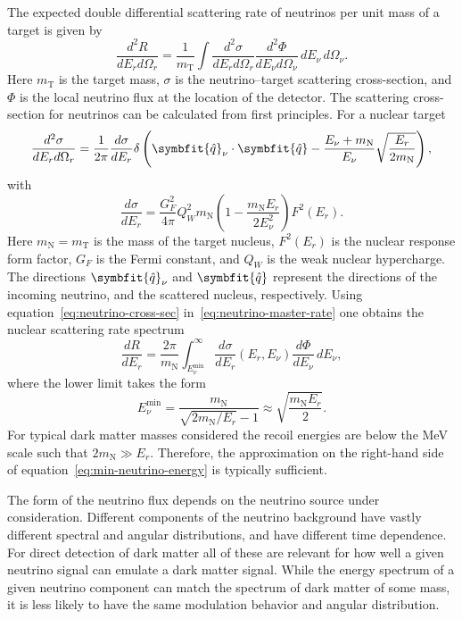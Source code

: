 \documentclass[b5paper, 10pt, twoside]{book}
\newcommand{\der}[2]{\frac{d#1}{d#2}}
\newcommand{\ddder}[3]{\frac{d^2#1}{d#2d#3}}
\newcommand{\unitv}[1]{\symbfit{\hat{#1}}}
\newcommand{\difd}{\,d}
\begin{document}
The expected double differential scattering rate of neutrinos per unit mass of a target is given by
\begin{equation}
\ddder{R}{E_r}{\Omega_r}=\frac{1}{m_\text{T}}\int\ddder{\sigma}{E_r}{\Omega_r}\ddder{\Phi}{E_\nu}{\Omega_\nu}\difd E_\nu\difd\Omega_\nu.
\label{eq:neutrino-master-rate}
\end{equation}
Here $m_\text{T}$ is the target mass, $\sigma$ is the neutrino--target scattering cross-section, and $\Phi$ is the local neutrino flux at the location of the detector. The scattering cross-section for neutrinos can be calculated from first principles. For a nuclear target
\begin{equation}
\ddder{\sigma}{E_r}{\Omega_r}=\frac{1}{2\pi}\der{\sigma}{E_r}\delta\left(\unitv{q}_\nu\cdot\unitv{q}-\frac{E_\nu+m_\text{N}}{E_\nu}\sqrt{\frac{E_r}{2m_\text{N}}}\right),
\label{eq:neutrino-cross-sec}
\end{equation}
with
\begin{equation}
\der{\sigma}{E_r}=\frac{G_F^2}{4\pi}Q_W^2m_\text{N}\left(1-\frac{m_\text{N}E_r}{2E_\nu^2}\right)F^2(E_r).
\end{equation}
Here $m_\text{N}=m_\text{T}$ is the mass of the target nucleus, $F^2(E_r)$ is the nuclear response form factor, $G_F$ is the Fermi constant, and $Q_W$ is the weak nuclear hypercharge. The directions $\unitv{q}_\nu$ and $\unitv{q}$ represent the directions of the incoming neutrino, and the scattered nucleus, respectively. Using equation~\eqref{eq:neutrino-cross-sec} in~\eqref{eq:neutrino-master-rate} one obtains the nuclear scattering rate spectrum
\begin{equation}
\der{R}{E_r}=\frac{2\pi}{m_\text{N}}\int_{E_\nu^\text{min}}^\infty\der{\sigma}{E_r}(E_r,E_\nu)\der{\Phi}{E_\nu}\difd E_\nu,
\end{equation}
where the lower limit takes the form
\begin{equation}
E_\nu^\text{min}=\frac{m_\text{N}}{\sqrt{2m_\text{N}/E_r}-1}\approx\sqrt{\frac{m_\text{N}E_r}{2}}.
\label{eq:min-neutrino-energy}
\end{equation}
For typical dark matter masses considered the recoil energies are below the MeV scale such that $2m_\text{N}\gg E_r$. Therefore, the approximation on the right-hand side of equation~\eqref{eq:min-neutrino-energy} is typically sufficient.

The form of the neutrino flux depends on the neutrino source under consideration. Different components of the neutrino background have vastly different spectral and angular distributions, and have different time dependence. For direct detection of dark matter all of these are relevant for how well a given neutrino signal can emulate a dark matter signal. While the energy spectrum of a given neutrino component can match the spectrum of dark matter of some mass, it is less likely to have the same modulation behavior and angular distribution.
\end{document}
